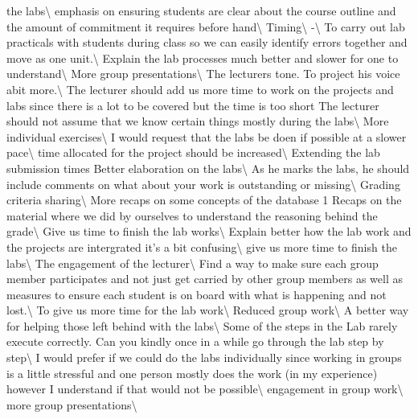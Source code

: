 \documentclass[
]{article}
\begin{document}
the labs\textbackslash{} \hline emphasis on ensuring students are clear
about the course outline and the amount of commitment it requires before
hand\textbackslash{} \hline Timing\textbackslash{} \hline
-\textbackslash{} \hline To carry out lab practicals with students
during class so we can easily identify errors together and move as one
unit.\textbackslash{} \hline Explain the lab processes much better and
slower for one to understand\textbackslash{} \hline More group
presentations\textbackslash{} \hline The lecturers tone. To project his
voice abit more.\textbackslash{} \hline The lecturer should add us more
time to work on the projects and labs since there is a lot to be covered
but the time is too short The lecturer should not assume that we know
certain things mostly during the labs\textbackslash{} \hline More
individual exercises\textbackslash{} \hline I would request that the
labs be doen if possible at a slower pace\textbackslash{} \hline time
allocated for the project should be increased\textbackslash{} \hline
Extending the lab submission times Better elaboration on the
labs\textbackslash{} \hline As he marks the labs, he should include
comments on what about your work is outstanding or
missing\textbackslash{} \hline Grading criteria sharing\textbackslash{}
\hline More recaps on some concepts of the database 1 Recaps on the
material where we did by ourselves to understand the reasoning behind
the grade\textbackslash{} \hline Give us time to finish the lab
works\textbackslash{} \hline Explain better how the lab work and the
projects are intergrated it's a bit confusing\textbackslash{} \hline
give us more time to finish the labs\textbackslash{} \hline The
engagement of the lecturer\textbackslash{} \hline Find a way to make
sure each group member participates and not just get carried by other
group members as well as measures to ensure each student is on board
with what is happening and not lost.\textbackslash{} \hline To give us
more time for the lab work\textbackslash{} \hline Reduced group
work\textbackslash{} \hline A better way for helping those left behind
with the labs\textbackslash{} \hline Some of the steps in the Lab rarely
execute correctly. Can you kindly once in a while go through the lab
step by step\textbackslash{} \hline I would prefer if we could do the
labs individually since working in groups is a little stressful and one
person mostly does the work (in my experience) however I understand if
that would not be possible\textbackslash{} \hline engagement in group
work\textbackslash{} \hline more group presentations\textbackslash{}
\end{document}
